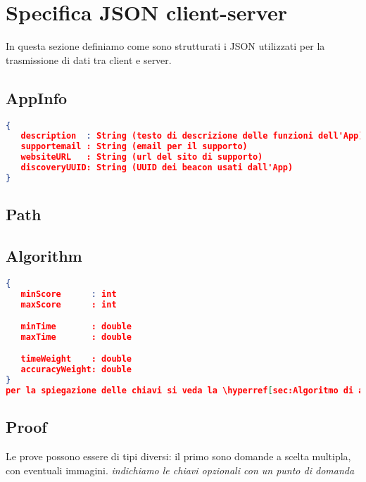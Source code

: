 \section{Specifica JSON client-server}
\label{sec:Specifica JSON client-server}

In questa sezione definiamo come sono strutturati i JSON utilizzati per la trasmissione di dati tra client e server.

\subsection{AppInfo}
\label{sub:AppInfo}
\begin{lstlisting}[language=json,firstnumber=1]
{
   description  : String (testo di descrizione delle funzioni dell'App)
   supportemail : String (email per il supporto)
   websiteURL   : String (url del sito di supporto)
   discoveryUUID: String (UUID dei beacon usati dall'App)
}
\end{lstlisting}



\subsection{Path}
\label{sub:Path}


\subsection{Algorithm}
\label{sub:Algorithm}
\begin{lstlisting}[language=json,firstnumber=1]
{
   minScore      : int
   maxScore      : int

   minTime       : double
   maxTime       : double

   timeWeight    : double
   accuracyWeight: double
}
per la spiegazione delle chiavi si veda la \hyperref[sec:Algoritmo di assegnazione del punteggio]{sezione corrispondente}.
\end{lstlisting}

\subsection{Proof}
\label{sub:Proof}

Le prove possono essere di tipi diversi: il primo sono domande a scelta multipla, con eventuali immagini.
\textit{indichiamo le chiavi opzionali con un punto di domanda}

